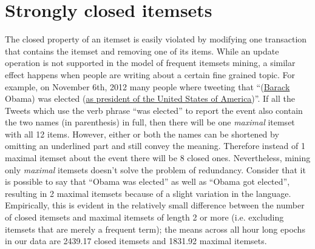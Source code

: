 \documentclass{sig-alternate}
\begin{document}
\section{Strongly closed itemsets}
\label{sec:strong}
The closed property of an itemset is easily violated by modifying one transaction that contains the itemset and removing one of its items. While an update operation is not supported in the model of frequent itemsets mining, a similar effect happens when people are writing about a certain fine grained topic. For example, on November 6th, 2012 many people where tweeting that ``(\underline{Barack} Obama) was elected (\underline{as president \underline{of the United States \underline{of America}}})''. If all the Tweets which use the verb phrase ``was elected'' to report the event also contain the two names (in parenthesis) in full, then there will be one  \emph{maximal}  itemset with all 12 items. However, either or both the names can be shortened by omitting an underlined part and still convey the meaning. 
Therefore instead of 1 maximal itemset about the event there will be 8 closed ones. Nevertheless, mining only \emph{maximal} itemsets doesn't solve the problem of redundancy. Consider that it is possible to say that ``Obama was elected'' as well as ``Obama got elected'', resulting in 2 maximal itemsets because of a slight variation in the language. Empirically, this is evident in the relatively small difference between the number of closed itemsets and maximal itemsets of length 2 or more (i.e. excluding itemsets that are merely a frequent term); the means across all hour long epochs in 
our data are 2439.17 closed itemsets and 1831.92 maximal itemsets. 
\end{document}
